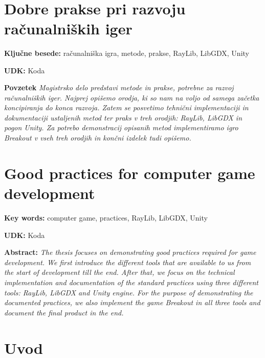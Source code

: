 \documentclass[12pt,a4paper,twoside]{book}
\begin{document}
\ \thispagestyle{empty}
\newpage
\ \thispagestyle{empty}
\chapter*{Dobre prakse pri razvoju računalniških iger}\thispagestyle{fancy}
\setcounter{page}{1}
\textbf{Ključne besede:} računalniška igra, metode, prakse, RayLib, LibGDX, Unity

\textbf{UDK:} Koda

\textbf{Povzetek}\newline
\textit{Magistrsko delo predstavi metode in prakse, potrebne za razvoj računalniških iger. Najprej opišemo orodja, ki so nam na voljo od samega začetka koncipiranja do konca razvoja. Zatem se posvetimo tehnični implementaciji in dokumentaciji ustaljenih metod ter praks v treh orodjih: RayLib, LibGDX in pogon Unity. Za potrebo demonstracij opisanih metod implementiramo igro Breakout v vseh treh orodjih in končni izdelek tudi opišemo.}
\cleardoublepage

\chapter*{Good practices for computer game development}\thispagestyle{fancy}
\textbf{Key words:} computer game, practices, RayLib, LibGDX, Unity

\textbf{UDK:} Koda

\textbf{Abstract:}\newline
\textit{The thesis focuses on demonstrating good practices required for game development. We first introduce the different tools that are available to us from the start of development till the end. After that, we focus on the technical implementation and documentation of the standard practices using three different tools: RayLib, LibGDX and Unity engine. For the purpose of demonstrating the documented practices, we also implement the game Breakout in all three tools and document the final product in the end.}
\cleardoublepage

\tableofcontents

\listoffigures

\lstlistoflistings

\chapter{Uvod}\thispagestyle{fancy}
\setcounter{page}{1}
\end{document}
